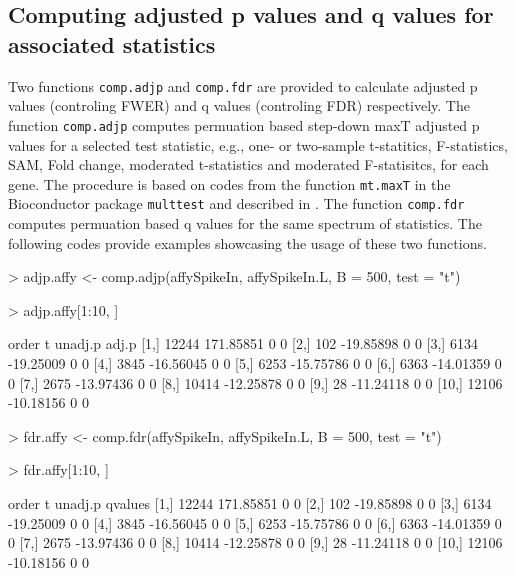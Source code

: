 \documentclass[11pt]{article}
\newcommand{\code}[1]{{\tt #1}}
\newcommand{\Rfunc}[1]{{\tt #1}}
\begin{document}
\subsection{Computing adjusted p values and q values for associated statistics}
Two functions \Rfunc{comp.adjp} and \Rfunc{comp.fdr} are provided to calculate 
adjusted p values (controling FWER) and q values (controling FDR) respectively. 
The function \Rfunc{comp.adjp} computes permuation based step-down maxT adjusted p values for a
selected test statistic, e.g., one- or two-sample   t-statitics, F-statistics, SAM, 
Fold change, moderated t-statistics and moderated F-statisitcs, for each gene. The 
procedure is based on codes from the function \code{mt.maxT} in the Bioconductor 
package \code{multtest} and described in \cite{Westfall&Young93}. The function
\Rfunc{comp.fdr} computes permuation based q values for the same spectrum of statistics.
The following codes provide examples showcasing the usage of these two functions.

\begin{Schunk}
\begin{Sinput}
> adjp.affy <- comp.adjp(affySpikeIn, affySpikeIn.L, B = 500, test = "t")
\end{Sinput}
\end{Schunk}

\begin{Schunk}
\begin{Sinput}
> adjp.affy[1:10, ]
\end{Sinput}
\begin{Soutput}
      order         t unadj.p adj.p
 [1,] 12244 171.85851       0     0
 [2,]   102 -19.85898       0     0
 [3,]  6134 -19.25009       0     0
 [4,]  3845 -16.56045       0     0
 [5,]  6253 -15.75786       0     0
 [6,]  6363 -14.01359       0     0
 [7,]  2675 -13.97436       0     0
 [8,] 10414 -12.25878       0     0
 [9,]    28 -11.24118       0     0
[10,] 12106 -10.18156       0     0
\end{Soutput}
\end{Schunk}

\begin{Schunk}
\begin{Sinput}
> fdr.affy <- comp.fdr(affySpikeIn, affySpikeIn.L, B = 500, test = "t")
\end{Sinput}
\end{Schunk}

\begin{Schunk}
\begin{Sinput}
> fdr.affy[1:10, ]
\end{Sinput}
\begin{Soutput}
      order         t unadj.p qvalues
 [1,] 12244 171.85851       0       0
 [2,]   102 -19.85898       0       0
 [3,]  6134 -19.25009       0       0
 [4,]  3845 -16.56045       0       0
 [5,]  6253 -15.75786       0       0
 [6,]  6363 -14.01359       0       0
 [7,]  2675 -13.97436       0       0
 [8,] 10414 -12.25878       0       0
 [9,]    28 -11.24118       0       0
[10,] 12106 -10.18156       0       0
\end{Soutput}
\end{Schunk}
\end{document}
